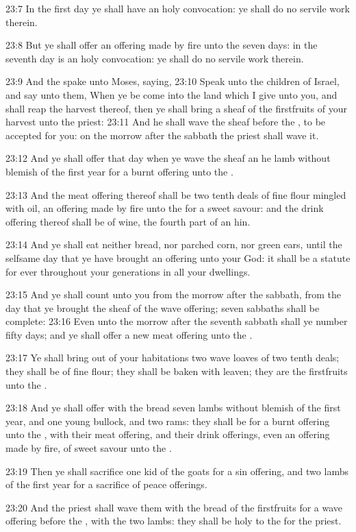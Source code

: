 23:7 In the first day ye shall have an holy convocation: ye shall do
no servile work therein.

23:8 But ye shall offer an offering made by fire unto the \LORD seven
days: in the seventh day is an holy convocation: ye shall do no
servile work therein.

23:9 And the \LORD spake unto Moses, saying, 23:10 Speak unto the
children of Israel, and say unto them, When ye be come into the land
which I give unto you, and shall reap the harvest thereof, then ye
shall bring a sheaf of the firstfruits of your harvest unto the
priest: 23:11 And he shall wave the sheaf before the \LORD, to be
accepted for you: on the morrow after the sabbath the priest shall
wave it.

23:12 And ye shall offer that day when ye wave the sheaf an he lamb
without blemish of the first year for a burnt offering unto the \LORD.

23:13 And the meat offering thereof shall be two tenth deals of fine
flour mingled with oil, an offering made by fire unto the \LORD for a
sweet savour: and the drink offering thereof shall be of wine, the
fourth part of an hin.

23:14 And ye shall eat neither bread, nor parched corn, nor green
ears, until the selfsame day that ye have brought an offering unto
your God: it shall be a statute for ever throughout your generations
in all your dwellings.

23:15 And ye shall count unto you from the morrow after the sabbath,
from the day that ye brought the sheaf of the wave offering; seven
sabbaths shall be complete: 23:16 Even unto the morrow after the
seventh sabbath shall ye number fifty days; and ye shall offer a new
meat offering unto the \LORD.

23:17 Ye shall bring out of your habitations two wave loaves of two
tenth deals; they shall be of fine flour; they shall be baken with
leaven; they are the firstfruits unto the \LORD.

23:18 And ye shall offer with the bread seven lambs without blemish of
the first year, and one young bullock, and two rams: they shall be for
a burnt offering unto the \LORD, with their meat offering, and their
drink offerings, even an offering made by fire, of sweet savour unto
the \LORD.

23:19 Then ye shall sacrifice one kid of the goats for a sin offering,
and two lambs of the first year for a sacrifice of peace offerings.

23:20 And the priest shall wave them with the bread of the firstfruits
for a wave offering before the \LORD, with the two lambs: they shall be
holy to the \LORD for the priest.


